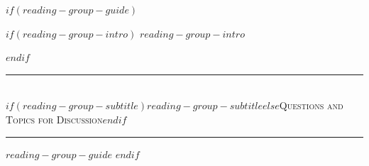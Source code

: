 $if(reading-group-guide)$
\label{reading-group-guide}

$if(reading-group-intro)$
\begingroup
\itshape
\setlength{\parindent}{1.5em}
\noindent
$reading-group-intro$
\par
\endgroup
\vspace{12pt}
$endif$

{\centering
\rule{0.4\textwidth}{0.4pt}\\[3pt]
{\scshape{}$if(reading-group-subtitle)$$reading-group-subtitle$$else$Questions and Topics for Discussion$endif$}\\[-4pt]
\rule{0.4\textwidth}{0.4pt}\par}

\begingroup
\newcommand{\guidenumber}[1]{\tikz[baseline=(n.base)]\node[circle,draw,line width=0.4pt,inner sep=0pt,minimum size=1.6em,font=\small\addfontfeature{Numbers=OldStyle}](n){\arabic{enumi}};}
\newcommand{\guidelist}{\setlength{\itemsep}{8pt}\setlength{\parskip}{0pt}\setlength{\labelsep}{0.8em}}
\let\tightlist\relax
$reading-group-guide$
\endgroup
$endif$
